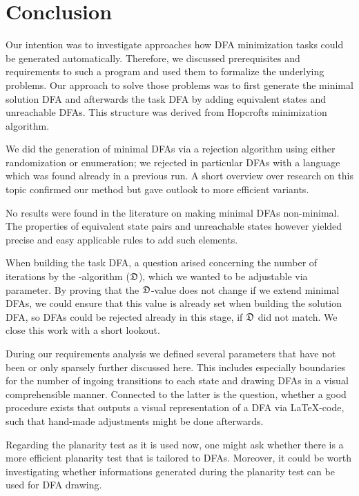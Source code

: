
\chapter{Conclusion}

Our intention was to investigate approaches how DFA minimization tasks could be generated automatically. Therefore, we discussed prerequisites and requirements to such a program and used them to formalize the underlying problems. Our approach to solve those problems was to first generate the minimal solution DFA and afterwards the task DFA by adding equivalent states and unreachable DFAs. This structure was derived from Hopcrofts minimization algorithm.

We did the generation of minimal DFAs via a rejection algorithm using either randomization or enumeration; we rejected in particular DFAs with a language which was found already in a previous run. A short overview over research on this topic confirmed our method but gave outlook to more efficient variants.

No results were found in the literature on making minimal DFAs non-minimal. The properties of equivalent state pairs and unreachable states however yielded precise and easy applicable rules to add such elements.

When building the task DFA, a question arised concerning the number of iterations by the \CompDist-algorithm ($\mathfrak{D}$), which we wanted to be adjustable via parameter. By proving that the $\mathfrak{D}$-value does not change if we extend minimal DFAs, we could ensure that this value is already set when building the solution DFA, so DFAs could be rejected already in this stage, if $\mathfrak{D}$ did not match. We close this work with a short lookout.

During our requirements analysis we defined several parameters that have not been or only sparsely further discussed here. This includes especially boundaries for the number of ingoing transitions to each state and drawing DFAs in a visual comprehensible manner. Connected to the latter is the question, whether a good procedure exists that outputs a visual representation of a DFA via \LaTeX-code, such that hand-made adjustments might be done afterwards.

Regarding the planarity test as it is used now, one might ask whether there is a more efficient planarity test that is tailored to DFAs. Moreover, it could be worth investigating whether informations generated during the planarity test can be used for DFA drawing.

